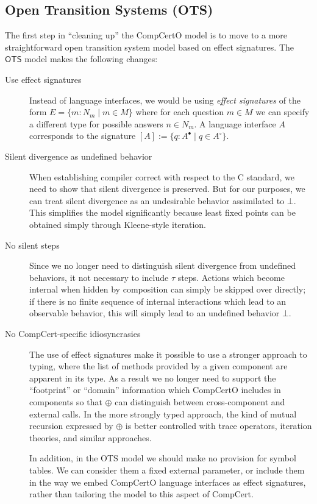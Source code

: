 \documentclass{report}
\begin{document}

\subsection{Open Transition Systems (OTS)} %

The first step in ``cleaning up'' the CompCertO model
is to move to a more straightforward open transition system model
based on effect signatures.
The $\mathsf{OTS}$ model makes the following changes:
\begin{description}
\item[Use effect signatures]
  Instead of language interfaces,
  we would be using
  \emph{effect signatures} of the form $E = \{ m : N_m \mid m \in M \}$
  where for each question $m \in M$
  we can specify a different type for possible answers $n \in N_m$.
  A language interface $A$ corresponds to the signature
  $[A] := \{ q : A^\bullet \mid q \in A^\circ \}$.

\item[Silent divergence as undefined behavior]
  When establishing compiler correct with respect to the C standard,
  we need to show that silent divergence is preserved.
  But for our purposes,
  we can treat silent divergence as an undesirable behavior
  assimilated to $\bot$.
  This simplifies the model significantly
  because least fixed points can be obtained simply through
  Kleene-style iteration.

\item[No silent steps]
  Since we no longer need
  to distinguish silent divergence from undefined behaviors,
  it not necessary to include $\tau$ steps.
  Actions which become internal when hidden by composition
  can simply be skipped over directly;
  if there is no finite sequence of internal interactions
  which lead to an observable behavior,
  this will simply lead to an undefined behavior $\bot$.

\item[No CompCert-specific idiosyncrasies]
  The use of effect signatures make it possible to use
  a stronger approach to typing,
  where the list of methods provided by a given component
  are apparent in its type.
  As a result we no longer need to support
  the ``footprint'' or ``domain'' information
  which CompCertO includes in components so that $\oplus$
  can distinguish between cross-component and external calls.
  In the more strongly typed approach,
  the kind of mutual recursion expressed by $\oplus$
  is better controlled with trace operators, iteration theories,
  and similar approaches.

  In addition,
  in the OTS model we should make no provision for symbol tables.
  We can consider them a fixed external parameter,
  or include them in the way we embed CompCertO language interfaces
  as effect signatures,
  rather than tailoring the model to this aspect of CompCert.
\end{description}
\end{document}
